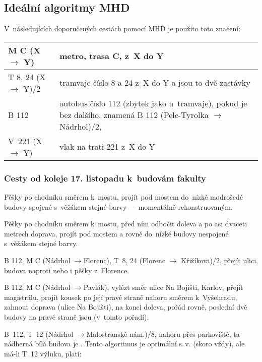 \subsection{Ideální algoritmy MHD}

\def\startpath{B 112, M C (Nádrhol \ra }
\def\ra{$\rightarrow$}

V~následujících doporučených cestách pomocí MHD je použito toto
značení:

\smallskip

\noindent\begin{tabularx}{\textwidth}{ l|X }
     M C (X $\rightarrow$ Y) & metro,  trasa C, z~X do Y \\ \hline
     T 8, 24 (X $\rightarrow$ Y)/2 & tramvaje číslo 8 a 24 z~X do Y a jsou to dvě zastávky \\ \hline
      B 112 &  autobus číslo 112 (zbytek jako u~tramvaje), pokud je
      bez dalšího, znamená B 112 (Pelc-Tyrolka $\rightarrow$ Nádrhol)/2, \\ \hline
      V~221 (X $\rightarrow$ Y) & vlak na trati 221 z~X do Y \\     
\end{tabularx}
\subsubsection{Cesty od koleje 17. listopadu k~budovám fakulty}

\bigskip
{} Pěšky po chodníku směrem k~mostu, projít
pod mostem do~nízké modrošedé budovy spojené s~věžákem stejné
barvy --- momentálně rekonstruovaným.

 Pěšky po chodníku směrem k~mostu, před
ním odbočit doleva a po asi dvaceti metrech doprava, projít pod
mostem a rovně do~nízké budovy nespojené s~věžákem stejné barvy.

\startpath Florenc), T~8, 24 (Florenc \ra
Křižíkova)/2, přejít ulici, budova naproti nebo i pěšky
z~Florence.

\startpath Pavlák), vylézt směr ulice Na Bojišti,
Karlov, přejít magistrálu, projít kousek po její pravé straně
nahoru směrem k~Vyšehradu, zahnout doprava (ulice Na Bojišti), na
konci doleva, pořád rovně, poslední dvě budovy na pravé straně
jsou  (v~tomto pořadí).

B~112, T~12 (Nádrhol \ra Malostranské
nám.)/8, nahoru přes parkoviště, ta nádherná bílá budova je \Mfz{}.
Tento algoritmus je optimální s.$\,$v. (skoro vždy), ale má-li
T~12 výluku, platí:

